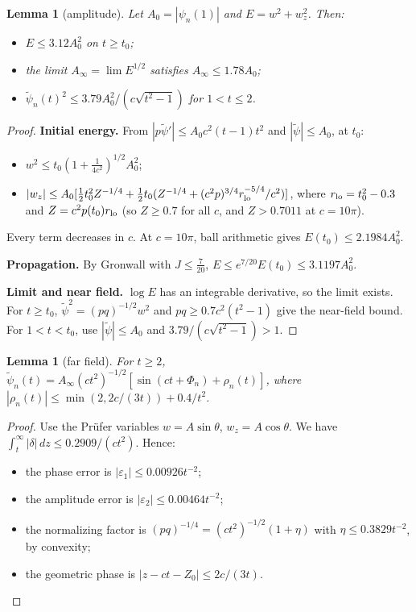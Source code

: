 \documentclass[11pt]{amsart}
\newtheorem{lemma}[proposition]{Lemma}
\theoremstyle{remark}
\numberwithin{equation}{section}
\begin{document}
\begin{lemma}[amplitude]\label{lem:amp}
Let $A_0=|\psi_n(1)|$ and $E=w^2+w_z^2$. Then:
\begin{itemize}
\item $E\le3.12A_0^2$ on $t\ge t_0$;
\item the limit $A_\infty=\lim E^{1/2}$ satisfies $A_\infty\le1.78A_0$;
\item $\tilde\psi_n(t)^2\le3.79A_0^2/(c\sqrt{t^2-1})$ for $1<t\le2$.
\end{itemize}
\end{lemma}
\begin{proof}
\textbf{Initial energy.} From $|p\tilde\psi'|\le A_0c^2(t-1)t^2$ and $|\tilde\psi|\le A_0$, at $t_0$:
\begin{itemize}
\item $w^2\le t_0(1+\frac1{4c^2})^{1/2}A_0^2$;
\item $|w_z|\le A_0[\frac12t_0^2Z^{-1/4}+\frac12t_0(Z^{-1/4}+(c^2p)^{3/4}r_{\rm lo}^{-5/4}/c^2)]$, where $r_{\rm lo}=t_0^2-0.3$ and $Z=c^2p(t_0)r_{\rm lo}$ (so $Z\ge0.7$ for all $c$, and $Z>0.7011$ at $c=10\pi$).
\end{itemize}
Every term decreases in $c$. At $c=10\pi$, ball arithmetic gives $E(t_0)\le2.1984A_0^2$.

\textbf{Propagation.} By Gronwall with $J\le\frac7{20}$, $E\le e^{7/20}E(t_0)\le3.1197A_0^2$.

\textbf{Limit and near field.} $\log E$ has an integrable derivative, so the limit exists. For $t\ge t_0$, $\tilde\psi^2=(pq)^{-1/2}w^2$ and $pq\ge0.7c^2(t^2-1)$ give the near-field bound. For $1<t<t_0$, use $|\tilde\psi|\le A_0$ and $3.79/(c\sqrt{t^2-1})>1$.
\end{proof}

\begin{lemma}[far field]\label{lem:S1a}
For $t\ge2$, $\tilde\psi_n(t)=A_\infty(ct^2)^{-1/2}[\sin(ct+\Phi_n)+\rho_n(t)]$, where $|\rho_n(t)|\le\min(2,2c/(3t))+0.4/t^2$.
\end{lemma}
\begin{proof}
Use the Pr\"ufer variables $w=A\sin\theta$, $w_z=A\cos\theta$. We have $\int_t^\infty|\delta|\,dz\le0.2909/(ct^2)$. Hence:
\begin{itemize}
\item the phase error is $|\varepsilon_1|\le0.00926t^{-2}$;
\item the amplitude error is $|\varepsilon_2|\le0.00464t^{-2}$;
\item the normalizing factor is $(pq)^{-1/4}=(ct^2)^{-1/2}(1+\eta)$ with $\eta\le0.3829t^{-2}$, by convexity;
\item the geometric phase is $|z-ct-Z_0|\le2c/(3t)$.
\end{itemize}
\end{proof}
\end{document}
